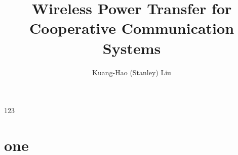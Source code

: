 \documentclass[12pt]{article}%
\begin{document}
\title{Wireless Power Transfer for Cooperative Communication Systems}
\date{}
\author{Kuang-Hao (Stanley) Liu}
\maketitle

123

\section{one}
\end{document}
